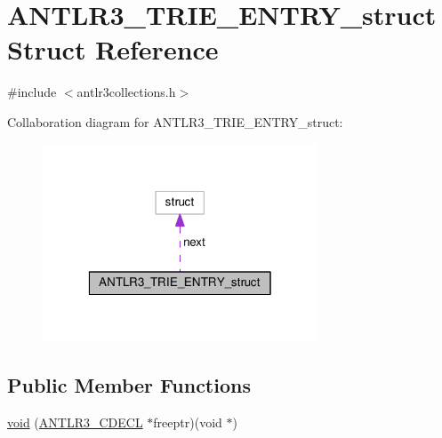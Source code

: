 \hypertarget{struct_a_n_t_l_r3___t_r_i_e___e_n_t_r_y__struct}{\section{A\-N\-T\-L\-R3\-\_\-\-T\-R\-I\-E\-\_\-\-E\-N\-T\-R\-Y\-\_\-struct Struct Reference}
\label{struct_a_n_t_l_r3___t_r_i_e___e_n_t_r_y__struct}
}


{\ttfamily \#include $<$antlr3collections.\-h$>$}



Collaboration diagram for A\-N\-T\-L\-R3\-\_\-\-T\-R\-I\-E\-\_\-\-E\-N\-T\-R\-Y\-\_\-struct\-:
\nopagebreak
\begin{figure}[H]
\begin{center}
\leavevmode
\includegraphics[width=232pt]{struct_a_n_t_l_r3___t_r_i_e___e_n_t_r_y__struct__coll__graph}
\end{center}
\end{figure}
\subsection*{Public Member Functions}
\begin{DoxyCompactItemize}
\item 
\hyperlink{struct_a_n_t_l_r3___t_r_i_e___e_n_t_r_y__struct_a1114cf1f9d4edc3a0783758e7ecbd989}{void} (\hyperlink{antlr3defs_8h_a91c919dd260a95cc88a0cd9b5c0a11cc}{A\-N\-T\-L\-R3\-\_\-\-C\-D\-E\-C\-L} $\ast$freeptr)(void $\ast$)
\end{DoxyCompactItemize}

